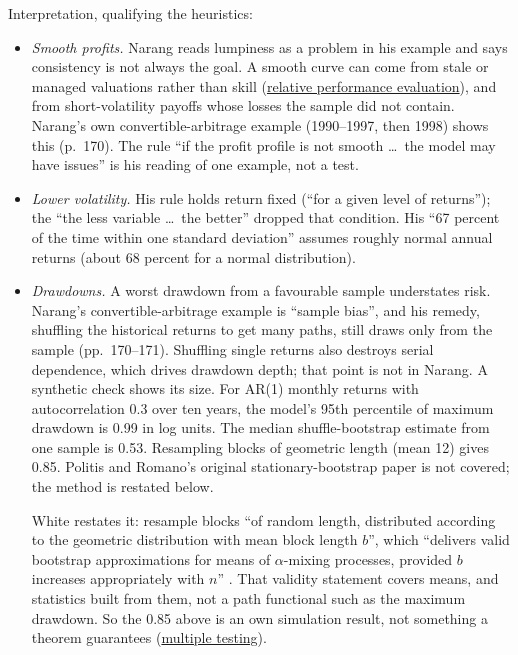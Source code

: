 \begin{qfmethod}
 Interpretation, qualifying the heuristics:
\begin{itemize}
\item \emph{Smooth profits.} Narang reads lumpiness as a problem in his example and says consistency is not always the goal. A smooth curve can come from stale or managed valuations rather than skill (\hyperref[meth:relative-performance-evaluation]{relative performance evaluation}), and from short-volatility payoffs whose losses the sample did not contain. Narang's own convertible-arbitrage example (1990--1997, then 1998) shows this (p.~170). The rule ``if the profit profile is not smooth \dots\ the model may have issues'' is his reading of one example, not a test.
\item \emph{Lower volatility.} His rule holds return fixed (``for a given level of returns''); the ``the less variable \dots\ the better'' dropped that condition. His ``67 percent of the time within one standard deviation'' assumes roughly normal annual returns (about 68 percent for a normal distribution).
\item \emph{Drawdowns.} A worst drawdown from a favourable sample understates risk. Narang's convertible-arbitrage example is ``sample bias'', and his remedy, shuffling the historical returns to get many paths, still draws only from the sample (pp.~170--171). Shuffling single returns also destroys serial dependence, which drives drawdown depth; that point is not in Narang. A synthetic check shows its size. For AR(1) monthly returns with autocorrelation 0.3 over ten years, the model's 95th percentile of maximum drawdown is 0.99 in log units. The median shuffle-bootstrap estimate from one sample is 0.53. Resampling blocks of geometric length (mean 12) gives 0.85. Politis and Romano's original stationary-bootstrap paper is not covered; the method is restated below.

White restates it: resample blocks ``of random length, distributed according to the geometric distribution with mean block length $b$'', which ``delivers valid bootstrap approximations for means of $\alpha$-mixing processes, provided $b$ increases appropriately with $n$'' \citep[sec.~2, p.~1104]{catalogue-0731}. That validity statement covers means, and statistics built from them, not a path functional such as the maximum drawdown. So the 0.85 above is an own simulation result, not something a theorem guarantees (\hyperref[meth:multiple-testing-control]{multiple testing}).


\end{itemize}
\end{qfmethod}
